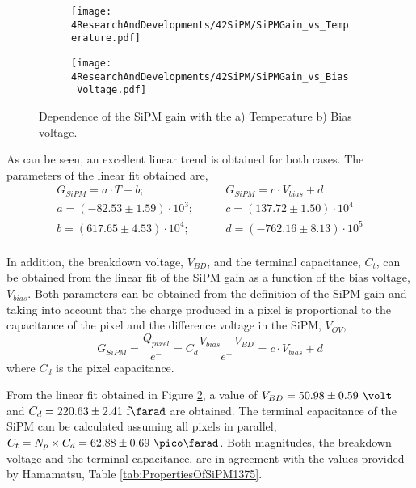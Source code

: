 \begin{figure}
\centering
    \begin{subfigure}[b]{0.9\textwidth}
    \centering
    \texttt{[image: 4ResearchAndDevelopments/42SiPM/SiPMGain\_vs\_Temperature.pdf]}  
    \caption{\label{subfig:SiPMGainvsTemperature}}
    \end{subfigure}
    \hfill
    \begin{subfigure}[b]{0.9\textwidth}
    \centering
    \texttt{[image: 4ResearchAndDevelopments/42SiPM/SiPMGain\_vs\_Bias\_Voltage.pdf]}  
    \caption{\label{subfig:SiPMGainvsBiasVoltage}}
    \end{subfigure}
 \caption{Dependence of the SiPM gain with the a) Temperature b) Bias voltage.}
 \label{fig:SiPMGainDependance}
\end{figure}

As can be seen, an excellent linear trend is obtained for both cases. The  parameters of the linear fit obtained are,
\begin{equation*}
\begin{split}
G_{SiPM}=a \cdot{} T + b;& \qquad G_{SiPM}=c \cdot{} V_{bias} + d\\
a=\left( -82.53 \pm 1.59 \right) \cdot{} 10^{3};& \qquad c=\left( 137.72 \pm 1.50 \right) \cdot{} 10^{4}\\
b=\left( 617.65 \pm 4.53 \right) \cdot{} 10^{4};& \qquad d=\left( -762.16 \pm 8.13 \right) \cdot{} 10^{5} \\
\label{SiPMGainVSTempV}
\end{split}
\end{equation*} 

In addition, the breakdown voltage, $V_{BD}$, and the terminal capacitance, $C_t$, can be obtained from the linear fit of the SiPM gain as a function of the bias voltage, $V_{bias}$. Both parameters can be obtained from the definition of the SiPM gain and taking into account that the charge produced in a pixel is proportional to the capacitance of the pixel and the difference voltage in the SiPM, $V_{OV}$,
\begin{equation}
G_{SiPM}=\frac{Q_{pixel}}{e^-} = C_d \frac{V_{bias}-V_{BD}}{e^-} = c \cdot{} V_{bias}+d
\label{SiPMGain_Capacitance}
\end{equation}
where $C_d$ is the pixel capacitance.

From the linear fit obtained in Figure \ref{subfig:SiPMGainvsBiasVoltage}, a value of $V_{BD}=50.98 \pm 0.59~\volt$ and $C_d{}= 220.63 \pm 2.41~\text{f}\farad$ are obtained. The terminal capacitance of the SiPM can be calculated assuming all pixels in parallel, $C_{t}=N_{p}\times C_{d}=62.88 \pm 0.69~\pico\farad$. Both magnitudes, the breakdown voltage and the terminal capacitance, are in agreement with the values provided by Hamamatsu, Table \ref{tab:PropertiesOfSiPM1375}. 

